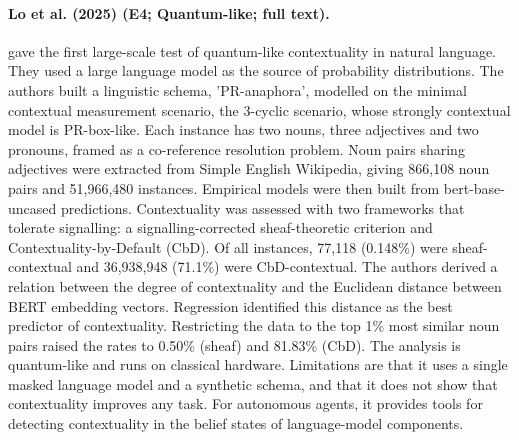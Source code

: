 \documentclass[10pt,a4paper]{article}
\begin{document}
\paragraph{Lo et al. (2025) (E4; Quantum-like; full text).} \citet{Lo2025} gave the first large-scale test of quantum-like contextuality in natural language. They used a large language model as the source of probability distributions. The authors built a linguistic schema, 'PR-anaphora', modelled on the minimal contextual measurement scenario, the 3-cyclic scenario, whose strongly contextual model is PR-box-like. Each instance has two nouns, three adjectives and two pronouns, framed as a co-reference resolution problem. Noun pairs sharing adjectives were extracted from Simple English Wikipedia, giving 866,108 noun pairs and 51,966,480 instances. Empirical models were then built from bert-base-uncased predictions. Contextuality was assessed with two frameworks that tolerate signalling: a signalling-corrected sheaf-theoretic criterion and Contextuality-by-Default (CbD). Of all instances, 77,118 (0.148\%) were sheaf-contextual and 36,938,948 (71.1\%) were CbD-contextual. The authors derived a relation between the degree of contextuality and the Euclidean distance between BERT embedding vectors. Regression identified this distance as the best predictor of contextuality. Restricting the data to the top 1\% most similar noun pairs raised the rates to 0.50\% (sheaf) and 81.83\% (CbD). The analysis is quantum-like and runs on classical hardware. Limitations are that it uses a single masked language model and a synthetic schema, and that it does not show that contextuality improves any task. For autonomous agents, it provides tools for detecting contextuality in the belief states of language-model components.
\end{document}
